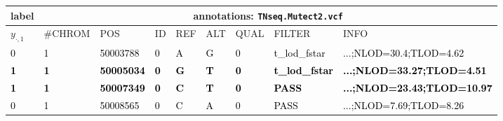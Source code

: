 \tiny
\setlength{\tabcolsep}{3pt}
\begin{tabular}{|l|llllllll|}
\hline
\footnotesize label &
\multicolumn{8}{|c|}{\footnotesize annotations: \texttt{TNseq.Mutect2.vcf}} \\
\hline
\(y_{\cdot,1}\) & \#CHROM & POS & ID & REF & ALT & QUAL & FILTER & INFO \\
\textcolor{black}{0} &
\textcolor{black}{1} &
\textcolor{black}{50003788} &
\textcolor{black}{0} &
\textcolor{black}{A} &
\textcolor{black}{G} &
\textcolor{black}{0} &
\textcolor{black}{t\_lod\_fstar} &
\textcolor{black}{...;NLOD=30.4;TLOD=4.62} \\
\bfseries \textcolor{black}{1} &
\bfseries \textcolor{black}{1} &
\bfseries \textcolor{black}{50005034} &
\bfseries \textcolor{black}{0} &
\bfseries \textcolor{black}{G} &
\bfseries \textcolor{black}{T} &
\bfseries \textcolor{black}{0} &
\bfseries \textcolor{black}{t\_lod\_fstar} &
\bfseries \textcolor{black}{...;NLOD=33.27;TLOD=4.51} \\
\bfseries \textcolor{black}{1} &
\bfseries \textcolor{black}{1} &
\bfseries \textcolor{black}{50007349} &
\bfseries \textcolor{black}{0} &
\bfseries \textcolor{black}{C} &
\bfseries \textcolor{black}{T} &
\bfseries \textcolor{black}{0} &
\bfseries \textcolor{black}{PASS} &
\bfseries \textcolor{black}{...;NLOD=23.43;TLOD=10.97} \\
\textcolor{black}{0} &
\textcolor{black}{1} &
\textcolor{black}{50008565} &
\textcolor{black}{0} &
\textcolor{black}{C} &
\textcolor{black}{A} &
\textcolor{black}{0} &
\textcolor{black}{PASS} &
\textcolor{black}{...;NLOD=7.69;TLOD=8.26} \\
\hline
\end{tabular}
\tiny
\\[1em]
